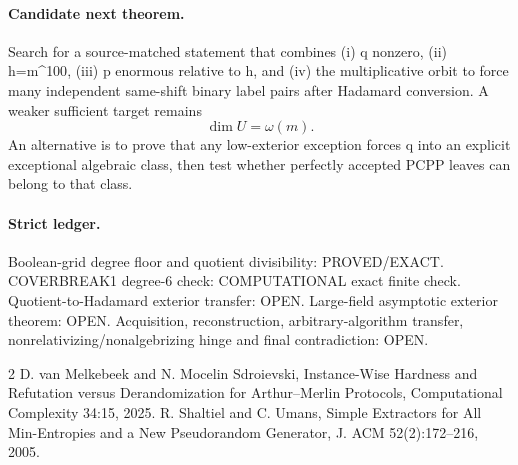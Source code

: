 \documentclass[11pt]{article}\usepackage[margin=.88in]{geometry}\usepackage{amsmath,amssymb}
\begin{document}
\paragraph{Candidate next theorem.}
Search for a source-matched statement that combines (i) q nonzero, (ii) h=m^{100}, (iii) p enormous relative to h, and (iv) the multiplicative orbit to force many independent same-shift binary label pairs after Hadamard conversion. A weaker sufficient target remains
\[
\boxed{\dim U=\omega(m)}.
\]
An alternative is to prove that any low-exterior exception forces q into an explicit exceptional algebraic class, then test whether perfectly accepted PCPP leaves can belong to that class.

\paragraph{Strict ledger.}
Boolean-grid degree floor and quotient divisibility: PROVED/EXACT. COVERBREAK1 degree-6 check: COMPUTATIONAL exact finite check. Quotient-to-Hadamard exterior transfer: OPEN. Large-field asymptotic exterior theorem: OPEN. Acquisition, reconstruction, arbitrary-algorithm transfer, nonrelativizing/nonalgebrizing hinge and final contradiction: OPEN.

\begin{thebibliography}{2}
 D. van Melkebeek and N. Mocelin Sdroievski, Instance-Wise Hardness and Refutation versus Derandomization for Arthur--Merlin Protocols, Computational Complexity 34:15, 2025.
 R. Shaltiel and C. Umans, Simple Extractors for All Min-Entropies and a New Pseudorandom Generator, J. ACM 52(2):172--216, 2005.
\end{thebibliography}
\end{document}
